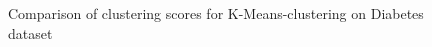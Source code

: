 \begin{figure}[H]
	\centering
	
	\caption{Comparison of clustering scores for K-Means-clustering on Diabetes dataset}%
	\label{fig:kmeans_diabetes}
\end{figure}

